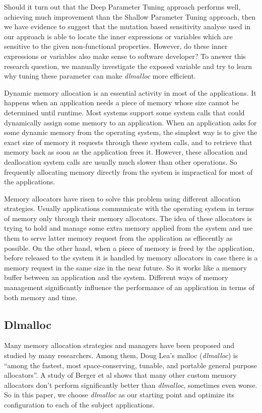 Should it turn out that the Deep Parameter Tuning approach performs well, achieving much improvement than the Shallow Parameter Tuning approach, then we have evidence to suggest that the mutation based sensitivity analyse used in our approach is able to locate the inner expressions or variables which are sensitive to the given non-functional properties. However, do these inner expressions or variables also make sense to software developer? To answer this research question, we manually investigate the exposed variable and try to learn why tuning these parameter can make \emph{dlmalloc} more efficient.  


Dynamic memory allocation is an essential activity in most of the applications. It happens when an application needs a piece of memory whose size cannot be determined until runtime. Most systems support some system calls that could dynamically assign some memory to an application. When an application asks for some dynamic memory from the operating system, the simplest way is to give the exact size of memory it requests through these system calls, and to retrieve that memory back as soon as the application frees it. However, these allocation and deallocation system calls are usually much slower than other operations. So frequently allocating memory directly from the system is impractical for most of the applications. 

Memory allocators have risen to solve this problem using different allocation strategies. Usually applications communicate with the operating system in terms of memory only through their memory allocators. The idea of these allocators is trying to hold and manage some extra memory applied from the system and use them to serve latter memory request from the application as effiecently as possible. On the other hand, when a piece of memory is freed by the application, before released to the system it is handled by memory allocators in case there is a memory request in the same size in the near future. So it works like a memory buffer between an application and the system. Different ways of memory management significantly influence the performance of an application in terms of both memory and time.

\subsection{Dlmalloc}

Many memory allocation strategies and managers have been proposed and studied by many researchers. Among them, Doug Lea's malloc (\emph{dlmalloc}) \cite{lea1996memory} is ``among the fastest, most space-conserving, tunable, and portable general purpose allocators''. A study of Berger et al\cite{Berger:2002:RCM:583854.582421} shows that many other custom memory allocators don't perform significantly better than \emph{dlmalloc}, sometimes even worse. So in this paper, we choose \emph{dlmalloc} as our starting point and optimize its configuration to each of the subject applications.

